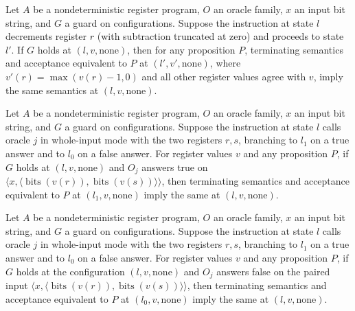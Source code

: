 \begin{lemma}
\label{Complexity.LogProg.nsem_dec}
\leanok
{}
Let $A$ be a nondeterministic register program, $O$ an oracle family, $x$ an input bit
string, and $G$ a guard on configurations. Suppose the instruction at state $l$
decrements register $r$ (with subtraction truncated at zero) and proceeds to state $l'$.
If $G$ holds at $(l,v,\mathrm{none})$, then for any proposition $P$, terminating
semantics and acceptance equivalent to $P$ at $(l',v',\mathrm{none})$, where
$v'(r)=\max(v(r)-1,0)$ and all other register values agree with $v$, imply the same
semantics at $(l,v,\mathrm{none})$.
\end{lemma}

\begin{lemma}
\leanok
{}
Let $A$ be a nondeterministic register program, $O$ an oracle family, $x$ an input bit
string, and $G$ a guard on configurations. Suppose the instruction at state $l$ calls
oracle $j$ in whole-input mode with the two registers $r,s$, branching to $l_1$ on a
true answer and to $l_0$ on a false answer. For register values $v$ and any proposition
$P$, if $G$ holds at $(l,v,\mathrm{none})$ and $O_j$ answers true on $\langle
x,\langle\operatorname{bits}(v(r)),\operatorname{bits}(v(s))\rangle\rangle$, then
terminating semantics and acceptance equivalent to $P$ at $(l_1,v,\mathrm{none})$ imply
the same at $(l,v,\mathrm{none})$.
\end{lemma}

\begin{lemma}
\leanok
{}
Let $A$ be a nondeterministic register program, $O$ an oracle family, $x$ an input bit
string, and $G$ a guard on configurations. Suppose the instruction at state $l$ calls
oracle $j$ in whole-input mode with the two registers $r,s$, branching to $l_1$ on a
true answer and to $l_0$ on a false answer. For register values $v$ and any proposition
$P$, if $G$ holds at the configuration $(l,v,\mathrm{none})$ and $O_j$ answers false on
the paired input $\langle
x,\langle\operatorname{bits}(v(r)),\operatorname{bits}(v(s))\rangle\rangle$, then
terminating semantics and acceptance equivalent to $P$ at $(l_0,v,\mathrm{none})$ imply
the same at $(l,v,\mathrm{none})$.
\end{lemma}


